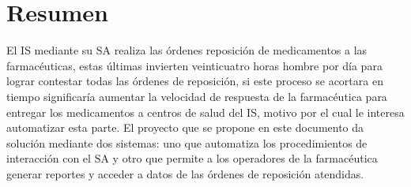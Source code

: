 \section{Resumen}
El IS mediante su SA realiza las órdenes reposición de medicamentos a las farmacéuticas, estas últimas invierten veinticuatro horas hombre por día para lograr contestar todas las órdenes de reposición, si este proceso se acortara en tiempo significaría aumentar la velocidad de respuesta de la farmacéutica para entregar los medicamentos a centros de salud del IS, motivo por el cual le interesa automatizar esta parte. El proyecto que se propone en este documento da solución mediante dos sistemas: uno que automatiza los procedimientos de interacción con el SA y otro que permite a los operadores de la farmacéutica generar reportes y acceder a datos de las órdenes de reposición atendidas.